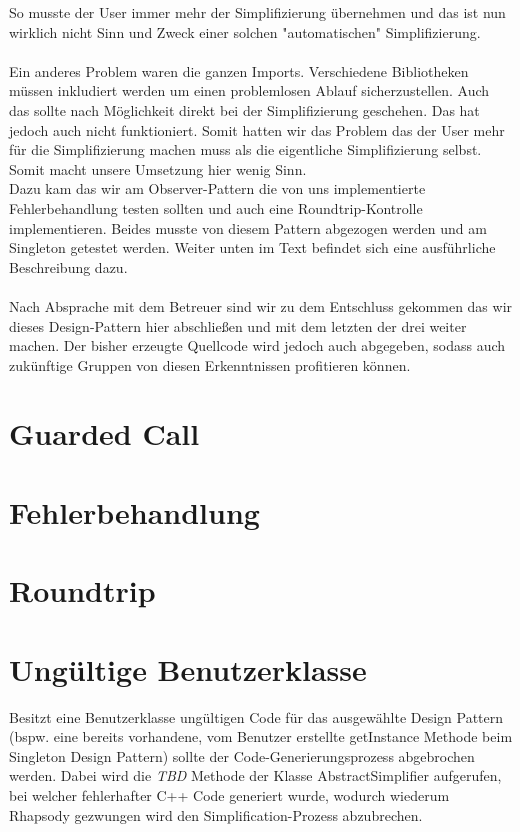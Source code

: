 So musste der User immer mehr der Simplifizierung übernehmen und das ist nun
wirklich nicht Sinn und Zweck einer solchen "automatischen" Simplifizierung.\\
\\
Ein anderes Problem waren die ganzen Imports. Verschiedene Bibliotheken müssen
inkludiert werden um einen problemlosen Ablauf sicherzustellen. Auch das sollte
nach Möglichkeit direkt bei der Simplifizierung geschehen. Das hat jedoch auch
nicht funktioniert. Somit hatten wir das Problem das der User mehr für die
Simplifizierung machen muss als die eigentliche Simplifizierung selbst. Somit
macht unsere Umsetzung hier wenig Sinn.\\
Dazu kam das wir am Observer-Pattern die von uns implementierte Fehlerbehandlung
testen sollten und auch eine Roundtrip-Kontrolle implementieren. Beides musste
von diesem Pattern abgezogen werden und am Singleton getestet werden. Weiter
unten im Text befindet sich eine ausführliche Beschreibung dazu.\\ \\
Nach Absprache mit dem Betreuer sind wir zu dem Entschluss gekommen das wir
dieses Design-Pattern hier abschließen und mit dem letzten der drei weiter machen.
Der bisher erzeugte Quellcode wird jedoch auch abgegeben, sodass auch zukünftige
Gruppen von diesen Erkenntnissen profitieren können.

\section{Guarded Call}

\section{Fehlerbehandlung}

\section{Roundtrip}


\section{Ungültige Benutzerklasse}
Besitzt eine Benutzerklasse ungültigen Code für das ausgewählte Design Pattern (bspw. eine 
bereits vorhandene, vom Benutzer erstellte getInstance Methode beim Singleton Design Pattern) 
sollte der Code-Generierungsprozess abgebrochen werden. Dabei wird die \textit{TBD} Methode der 
Klasse AbstractSimplifier aufgerufen, bei welcher fehlerhafter C++ Code generiert wurde, wodurch 
wiederum Rhapsody gezwungen wird den Simplification-Prozess abzubrechen.